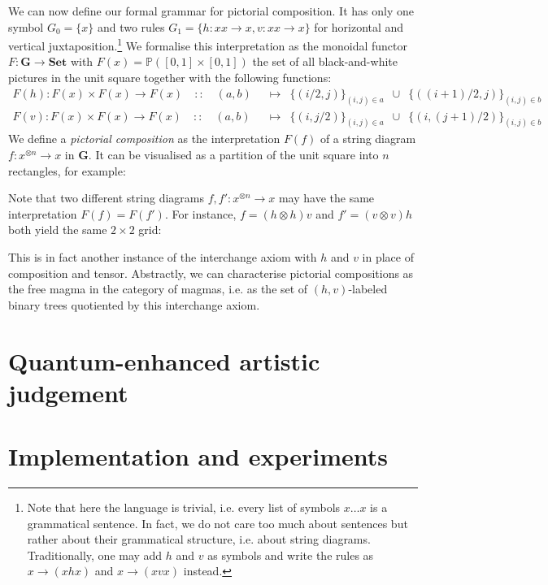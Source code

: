 We can now define our formal grammar for pictorial composition.
It has only one symbol $G_0 = \{ x \}$ and two rules $G_1 = \{ h : x x \to x, v : x x \to x \}$ for horizontal and vertical juxtaposition.\footnote
{Note that here the language is trivial, i.e. every list of symbols $x \dots x$ is a grammatical sentence.
In fact, we do not care too much about sentences but rather about their grammatical structure, i.e. about string diagrams.
Traditionally, one may add $h$ and $v$ as symbols and write the rules as $x \to (x h x)$ and $x \to (x v x)$ instead.}
We formalise this interpretation as the monoidal functor $F : \mathbf{G} \to \mathbf{Set}$ with $F(x) = \mathbb{P}([0, 1] \times [0, 1])$ the set of all black-and-white pictures in the unit square together with the following functions:
\begin{align*}
    F(h) : F(x) \times F(x) \to F(x) \quad :: \quad (a, b) \enspace &\mapsto \enspace \{ (i / 2, j) \}_{(i, j) \in a}
    \enspace \cup \enspace \{ ((i + 1) / 2, j) \}_{(i, j) \in b}\\
    F(v) : F(x) \times F(x) \to F(x) \quad :: \quad (a, b) \enspace &\mapsto \enspace \{ (i, j / 2) \}_{(i, j) \in a}
    \enspace \cup \enspace \{ (i, (j + 1) / 2) \}_{(i, j) \in b}
\end{align*}
We define a \emph{pictorial composition} as the interpretation $F(f)$ of a string diagram $f : x^{\otimes n} \to x$ in $\mathbf{G}$.
It can be visualised as a partition of the unit square into $n$ rectangles, for example:
\begin{center}

\end{center}
Note that two different string diagrams $f, f' : x^{\otimes n} \to x$ may have the same interpretation $F(f) = F(f')$.
For instance, $f = (h \otimes h) v$ and $f' = (v \otimes v) h$ both yield the same $2 \times 2$ grid:
\begin{center}
    
\end{center}
This is in fact another instance of the interchange axiom with $h$ and $v$ in place of composition and tensor.
Abstractly, we can characterise pictorial compositions as the free magma in the category of magmas, i.e. as the set of $(h, v)$-labeled binary trees quotiented by this interchange axiom.

\section{Quantum-enhanced artistic judgement}\label{quantum}
\section{Implementation and experiments}\label{discopy}

\printbibliography


